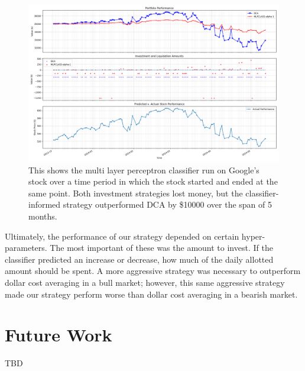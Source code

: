 \documentclass[12pt]{article}
\begin{document}
\begin{figure}
	\centering
	\includegraphics[width=\linewidth]{../Results/GOOG-DCA-MLPCLASS-2013-12-02--2014-05-12-alphas--[1]-train_length--1-performanceplot}
	\caption{This shows the multi layer perceptron classifier run on Google's stock over a time period in which the stock started and ended at the same point. Both investment strategies lost money, but the classifier-informed strategy outperformed DCA by \$10000 over the span of 5 months.}
	\label{class-steady}
\end{figure}


Ultimately, the performance of our strategy depended on certain hyper-parameters. The most important of these was the amount to invest. If the classifier predicted an increase or decrease, how much of the daily allotted amount should be spent. A more aggressive strategy was necessary to outperform dollar cost averaging in a bull market; however, this same aggressive strategy made our strategy perform worse than dollar cost averaging in a bearish market.

\section{Future Work}
TBD

\newpage
\appendix
\end{document}
